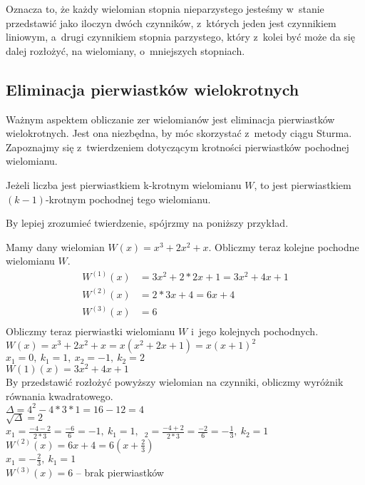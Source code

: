 Oznacza to, że każdy wielomian stopnia nieparzystego jesteśmy w~stanie przedstawić jako iloczyn dwóch czynników, z~których jeden jest czynnikiem liniowym, a~drugi czynnikiem stopnia parzystego, który z~kolei być może da się dalej rozłożyć, na wielomiany, o~mniejszych stopniach.

\subsection{Eliminacja pierwiastków wielokrotnych}

Ważnym aspektem obliczanie zer wielomianów jest eliminacja pierwiastków wielokrotnych. Jest ona niezbędna, by móc skorzystać z~metody ciągu Sturma. Zapoznajmy się z~twierdzeniem dotyczącym krotności pierwiastków pochodnej wielomianu.

\begin{theorem}
	$ $\\
	Jeżeli liczba jest pierwiastkiem k-krotnym wielomianu $W$, to jest pierwiastkiem $(k-1)$-krotnym pochodnej tego wielomianu.
\end{theorem}

By lepiej zrozumieć twierdzenie, spójrzmy na poniższy przykład.

\begin{example}
	$ $\\
	Mamy dany wielomian $W(x) = x^3 + 2x^2 + x$. Obliczmy teraz kolejne pochodne wielomianu $W$. \\
	\begin{equation*}
	\begin{split}
		W^{(1)}(x) &= 3x^2 + 2*2x + 1 = 3x^2 + 4x + 1 \\
		W^{(2)}(x) &= 2*3x + 4 = 6x + 4 \\
		W^{(3)}(x) &= 6 \\
	\end{split}
	\end{equation*}
	Obliczmy teraz pierwiastki wielomianu $W$ i~jego kolejnych pochodnych. \\
	$W(x) = x^3 + 2x^2 + x = x(x^2 + 2x +1) = x(x + 1)^2$ \\
	$x_1 = 0,\ k_1 = 1,\ x_2 = -1,\ k_2 = 2$ \\
	$W{(1)}(x) = 3x^2 + 4x + 1$ \\
	By przedstawić rozłożyć powyższy wielomian na czynniki, obliczmy wyróżnik równania kwadratowego.\\
	$\Delta = 4^2 - 4*3*1 = 16 - 12 = 4$ \\
	$\sqrt{\Delta} = 2$ \\
	$x_1 = \frac{-4-2}{2*3} = \frac{-6}{6} = -1,\ k_1 = 1,$\ $_2 = \frac{-4+2}{2*3} = \frac{-2}{6} = -\frac{1}{3},\ k_2 = 1$ \\
	$W^{(2)}(x) = 6x + 4 = 6 (x + \frac{2}{3})$ \\
	$x_1 = -\frac{2}{3},\ k_1 = 1$ \\
	$W^{(3)}(x) = 6$ -- brak pierwiastków
\end{example}

